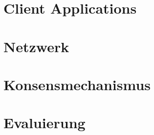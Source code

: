 \section{Client Applications}

\section{Netzwerk}

\section{Konsensmechanismus}




\section{Evaluierung}




